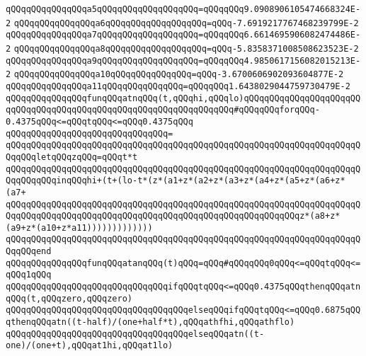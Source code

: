 \verb|qQQqqQQqqQQqqQQqa5qQQqqQQqqQQqqQQqqQQq=qQQqqQQq9.0908906105474668324E-2|\newline
\verb|qQQqqQQqqQQqqQQqa6qQQqqQQqqQQqqQQqqQQq=qQQq-7.6919217767468239799E-2|\newline
\verb|qQQqqQQqqQQqqQQqa7qQQqqQQqqQQqqQQqqQQq=qQQqqQQq6.6614695906082474486E-2|\newline
\verb|qQQqqQQqqQQqqQQqa8qQQqqQQqqQQqqQQqqQQq=qQQq-5.8358371008508623523E-2|\newline
\verb|qQQqqQQqqQQqqQQqa9qQQqqQQqqQQqqQQqqQQq=qQQqqQQq4.9850617156082015213E-2|\newline
\verb|qQQqqQQqqQQqqQQqa10qQQqqQQqqQQqqQQq=qQQq-3.6700606902093604877E-2|\newline
\verb|qQQqqQQqqQQqqQQqa11qQQqqQQqqQQqqQQq=qQQqqQQq1.6438029044759730479E-2|\newline
\newline
\verb|qQQqqQQqqQQqqQQqfunqQQqatnqQQq(t,qQQqhi,qQQqlo)qQQqqQQqqQQqqQQqqQQqqQQqqQQqqQQqqQQqqQQqqQQqqQQqqQQqqQQqqQQqqQQqqQQq#qQQqqQQqforqQQq-0.4375qQQq<=qQQqtqQQq<=qQQq0.4375qQQq|\newline
\verb|qQQqqQQqqQQqqQQqqQQqqQQqqQQqqQQq=|\newline
\verb|qQQqqQQqqQQqqQQqqQQqqQQqqQQqqQQqqQQqqQQqqQQqqQQqqQQqqQQqqQQqqQQqqQQqqQQqqQQqletqQQqzqQQq=qQQqt*t|\newline
\verb|qQQqqQQqqQQqqQQqqQQqqQQqqQQqqQQqqQQqqQQqqQQqqQQqqQQqqQQqqQQqqQQqqQQqqQQqqQQqqQQqinqQQqhi+(t+(lo-t*(z*(a1+z*(a2+z*(a3+z*(a4+z*(a5+z*(a6+z*(a7+|\newline
\verb|qQQqqQQqqQQqqQQqqQQqqQQqqQQqqQQqqQQqqQQqqQQqqQQqqQQqqQQqqQQqqQQqqQQqqQQqqQQqqQQqqQQqqQQqqQQqqQQqqQQqqQQqqQQqqQQqqQQqqQQqqQQqqQQqz*(a8+z*(a9+z*(a10+z*a11)))))))))))))|\newline
\verb|qQQqqQQqqQQqqQQqqQQqqQQqqQQqqQQqqQQqqQQqqQQqqQQqqQQqqQQqqQQqqQQqqQQqqQQqqQQqend|\newline
\newline
\verb|qQQqqQQqqQQqqQQqfunqQQqatanqQQq(t)qQQq=qQQq#qQQqqQQq0qQQq<=qQQqtqQQq<=qQQq1qQQq|\newline
\verb|qQQqqQQqqQQqqQQqqQQqqQQqqQQqqQQqifqQQqtqQQq<=qQQq0.4375qQQqthenqQQqatnqQQq(t,qQQqzero,qQQqzero)|\newline
\verb|qQQqqQQqqQQqqQQqqQQqqQQqqQQqqQQqqQQqelseqQQqifqQQqtqQQq<=qQQq0.6875qQQqthenqQQqatn((t-half)/(one+half*t),qQQqathfhi,qQQqathflo)|\newline
\verb|qQQqqQQqqQQqqQQqqQQqqQQqqQQqqQQqqQQqelseqQQqatn((t-one)/(one+t),qQQqat1hi,qQQqat1lo)|\newline
